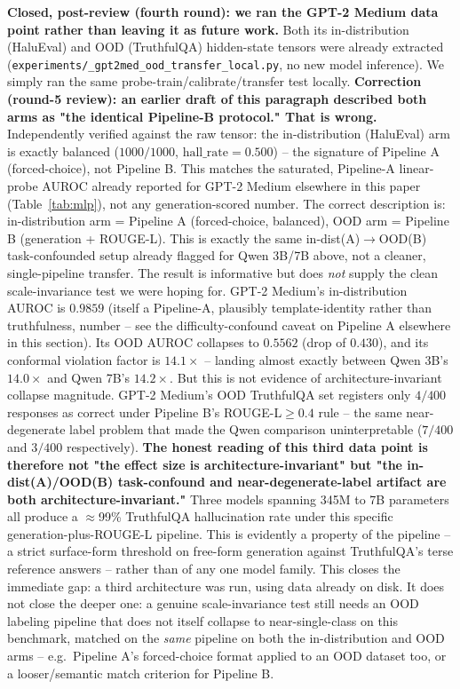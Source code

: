 \documentclass[onecolumn]{jmlr}
\begin{document}
\textbf{Closed, post-review (fourth round): we ran the GPT-2 Medium
data point rather than leaving it as future work.} Both its
in-distribution (HaluEval) and OOD (TruthfulQA) hidden-state tensors
were already extracted
(\texttt{experiments/\allowbreak {}\_\allowbreak \allowbreak gpt2med\_\allowbreak \allowbreak ood\_\allowbreak \allowbreak transfer\_\allowbreak \allowbreak local.py}, no
new model inference). We simply ran the same
probe-train/calibrate/transfer test locally. \textbf{Correction
(round-5 review): an earlier draft of this paragraph described both
arms as "the identical Pipeline-B protocol." That is wrong.}
Independently verified against the raw tensor: the in-distribution
(HaluEval) arm is exactly balanced ($1000/1000$,
$\text{hall\_rate}=0.500$) -- the signature of Pipeline A
(forced-choice), not Pipeline B. This matches the saturated,
Pipeline-A linear-probe AUROC already reported for GPT-2 Medium
elsewhere in this paper (Table~\ref{tab:mlp}), not any
generation-scored number. The correct description is: in-distribution
arm = Pipeline A (forced-choice, balanced), OOD arm = Pipeline B
(generation + ROUGE-L). This is exactly the same
in-dist(A)$\to$OOD(B) task-confounded setup already flagged for Qwen
3B/7B above, not a cleaner, single-pipeline transfer. The result is
informative but does \emph{not} supply the clean scale-invariance test
we were hoping for. GPT-2 Medium's in-distribution AUROC is $0.9859$
(itself a Pipeline-A, plausibly template-identity rather than
truthfulness, number -- see the difficulty-confound caveat on Pipeline
A elsewhere in this section). Its OOD AUROC collapses to $0.5562$
(drop of $0.430$), and its conformal violation factor is $14.1\times$
-- landing almost exactly between Qwen 3B's $14.0\times$ and Qwen 7B's
$14.2\times$. But this is not evidence of architecture-invariant
collapse magnitude. GPT-2 Medium's OOD TruthfulQA set registers only
$4/400$ responses as correct under Pipeline B's ROUGE-L$\geq 0.4$ rule
-- the same near-degenerate label problem that made the Qwen
comparison uninterpretable ($7/400$ and $3/400$ respectively).
\textbf{The honest reading of this third data point is therefore not
"the effect size is architecture-invariant" but "the in-dist(A)/OOD(B)
task-confound and near-degenerate-label artifact are both
architecture-invariant."} Three models spanning 345M to 7B parameters
all produce a $\approx$99\% TruthfulQA hallucination rate under this
specific generation-plus-ROUGE-L pipeline. This is evidently a property
of the pipeline -- a strict surface-form threshold on free-form
generation against TruthfulQA's terse reference answers -- rather than
of any one model family. This closes the immediate gap: a third
architecture was run, using data already on disk. It does not close the
deeper one: a
genuine scale-invariance test still needs an OOD labeling pipeline that
does not itself collapse to near-single-class on this benchmark,
matched on the \emph{same} pipeline on both the in-distribution and OOD
arms -- e.g.\ Pipeline A's forced-choice format applied to an OOD
dataset too, or a looser/semantic match criterion for Pipeline B.
\end{document}
